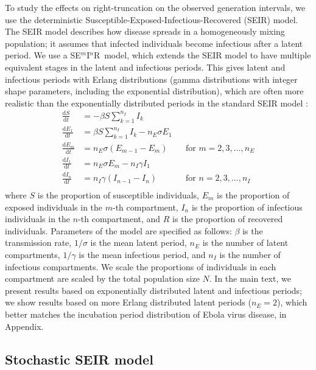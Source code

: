 \documentclass[12pt]{article}
\newcommand{\seminar}{SE\mbox{$^m$}I\mbox{$^n$}R}
\begin{document}
To study the effects on right-truncation on the observed generation intervals, we use the deterministic Susceptible-Exposed-Infectious-Recovered (SEIR) model.
The SEIR model describes how disease spreads in a homogeneously mixing population; it assumes that infected individuals become infectious after a latent period.
We use a \seminar\ model, which extends the SEIR model to have multiple equivalent stages in the latent and infectious periods. This gives latent and infectious periods with Erlang distributions (gamma distributions with integer shape parameters, including the exponential distribution), which are often more realistic than the exponentially distributed periods in the standard SEIR model \citep{anderson1980spread, bailey1964some}: 
\begin{equation}
\begin{aligned}
\frac{\mathrm{d}S}{\mathrm{d}t} &= - \beta S \sum_{k=1}^{n_I} I_k\\
\frac{\mathrm{d}E_1}{\mathrm{d}t} &= \beta S \sum_{k=1}^{n_I} I_k - n_E \sigma E_1\\
\frac{\mathrm{d}E_m}{\mathrm{d}t} &= n_E \sigma (E_{m-1} - E_m) && \text{for } m = 2, 3, \dots, n_E\\
\frac{\mathrm{d}I_1}{\mathrm{d}t} &= n_E \sigma E_m - n_I \gamma I_1\\
\frac{\mathrm{d}I_n}{\mathrm{d}t} &= n_I \gamma (I_{n-1} - I_n) && \text{for } n = 2, 3, \dots, n_I\\
\end{aligned}
\end{equation}
where $S$ is the proportion of susceptible individuals, $E_m$ is the proportion of exposed individuals in the $m$-th compartment, $I_n$ is the proportion of infectious individuals in the $n$-th compartment, and $R$ is the proportion of recovered individuals.
Parameters of the model are specified as follows:  $\beta$ is the transmission rate, $1/\sigma$ is the mean latent period, $n_E$ is the number of latent compartments, $1/\gamma$ is the mean infectious period, and $n_I$ is the number of infectious compartments.
We scale the proportions of individuals in each compartment are scaled by the total population size $N$.
In the main text, we present results based on exponentially distributed latent and infectious periods;
we show results based on more Erlang distributed latent periods ($n_E=2$), which better matches the incubation period distribution of Ebola virus disease, in Appendix.

\subsection{Stochastic SEIR model}
\end{document}
